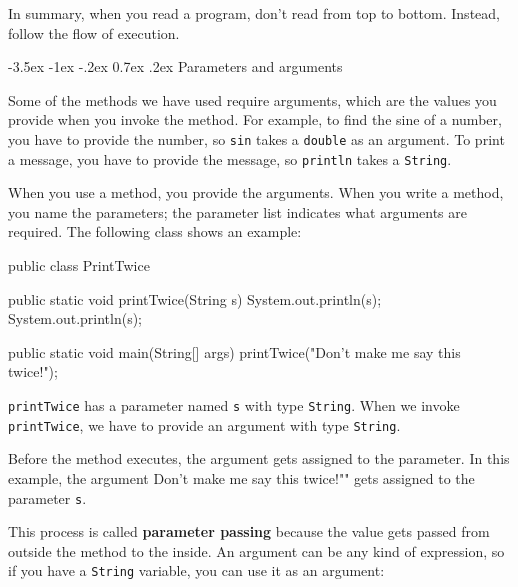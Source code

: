 \documentclass[12pt]{book}
\makeatletter
\theoremstyle{exercise}
\newcommand{\java}[1]{\verb"#1"}
\renewcommand{\section}{\@startsection{section}{1}{\z@}%
    {-3.5ex \@plus -1ex \@minus -.2ex}%
    {0.7ex \@plus.2ex}%
    {\normalfont\Large\bfseries}}
\newcommand{\java}[1]{\lstinline{#1}} %
\makeatother
\begin{document}
In summary, when you read a program, don't read from top to bottom.
Instead, follow the flow of execution.



\section{Parameters and arguments}


Some of the methods we have used require arguments, which are the values you provide when you invoke the method.
For example, to find the sine of a number, you have to provide the number, so \java{sin} takes a \java{double} as an argument.
To print a message, you have to provide the message, so \java{println} takes a \java{String}.

When you use a method, you provide the arguments.
When you write a method, you name the parameters; the parameter list indicates what arguments are required.
The following class shows an example:

\begin{code}
public class PrintTwice {

    public static void printTwice(String s) {
        System.out.println(s);
        System.out.println(s);
    }

    public static void main(String[] args) {
        printTwice("Don't make me say this twice!");
    }
}
\end{code}

\java{printTwice} has a parameter named \java{s} with type \java{String}.
When we invoke \java{printTwice}, we have to provide an argument with type \java{String}.

Before the method executes, the argument gets assigned to the parameter.
In this example, the argument \java{"Don't make me say this twice!"} gets assigned to the parameter \java{s}.


This process is called {\bf parameter passing} because the value gets passed from outside the method to the inside.
An argument can be any kind of expression, so if you have a \java{String} variable, you can use it as an argument:
\end{document}
